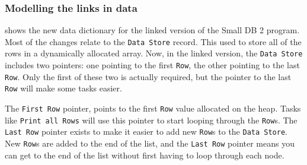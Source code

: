 \subsubsection{Modelling the links in data} %
\label{ssub:modelling_the_links_in_data}

 shows the new data dictionary for the linked version of the Small DB 2 program. Most of the changes relate to the \texttt{Data Store} record. This used to store all of the rows in a dynamically allocated array. Now, in the linked version, the \texttt{Data Store} includes two pointers: one pointing to the first \texttt{Row}, the other pointing to the last \texttt{Row}. Only the first of these two is actually required, but the pointer to the last \texttt{Row} will make some tasks easier.

The \texttt{First Row} pointer, points to the first \texttt{Row} value allocated on the heap. Tasks like \texttt{Print all Rows} will use this pointer to start looping through the \texttt{Row}s. The \texttt{Last Row} pointer exists to make it easier to add new \texttt{Row}s to the \texttt{Data Store}. New \texttt{Row}s are added to the end of the list, and the \texttt{Last Row} pointer means you can get to the end of the list without first having to loop through each node.

